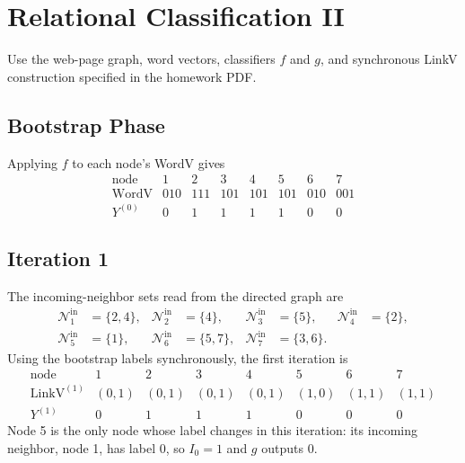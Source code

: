 \clearpage
\section{Relational Classification II}

Use the web-page graph, word vectors, classifiers $f$ and $g$, and synchronous
LinkV construction specified in the homework PDF.

\subsection{Bootstrap Phase}

\begin{solution}
Applying $f$ to each node's WordV gives
\[
\begin{array}{c|ccccccc}
  \text{node} & 1 & 2 & 3 & 4 & 5 & 6 & 7 \\ \hline
  \text{WordV} & 010 & 111 & 101 & 101 & 101 & 010 & 001 \\
  Y^{(0)} & 0 & 1 & 1 & 1 & 1 & 0 & 0
\end{array}
\]
\end{solution}

\subsection{Iteration 1}

\begin{solution}
The incoming-neighbor sets read from the directed graph are
\[
\begin{aligned}
  \mathcal N_1^{\mathrm{in}}&=\{2,4\}, &
  \mathcal N_2^{\mathrm{in}}&=\{4\}, &
  \mathcal N_3^{\mathrm{in}}&=\{5\}, &
  \mathcal N_4^{\mathrm{in}}&=\{2\}, \\
  \mathcal N_5^{\mathrm{in}}&=\{1\}, &
  \mathcal N_6^{\mathrm{in}}&=\{5,7\}, &
  \mathcal N_7^{\mathrm{in}}&=\{3,6\}. &&
\end{aligned}
\]
Using the bootstrap labels synchronously, the first iteration is
\[
\begin{array}{c|ccccccc}
  \text{node} & 1 & 2 & 3 & 4 & 5 & 6 & 7 \\ \hline
  \text{LinkV}^{(1)}
    & (0,1) & (0,1) & (0,1) & (0,1) & (1,0) & (1,1) & (1,1) \\
  Y^{(1)}
    & 0 & 1 & 1 & 1 & 0 & 0 & 0
\end{array}
\]
Node 5 is the only node whose label changes in this iteration: its incoming
neighbor, node 1, has label 0, so $I_0=1$ and $g$ outputs 0.
\end{solution}

